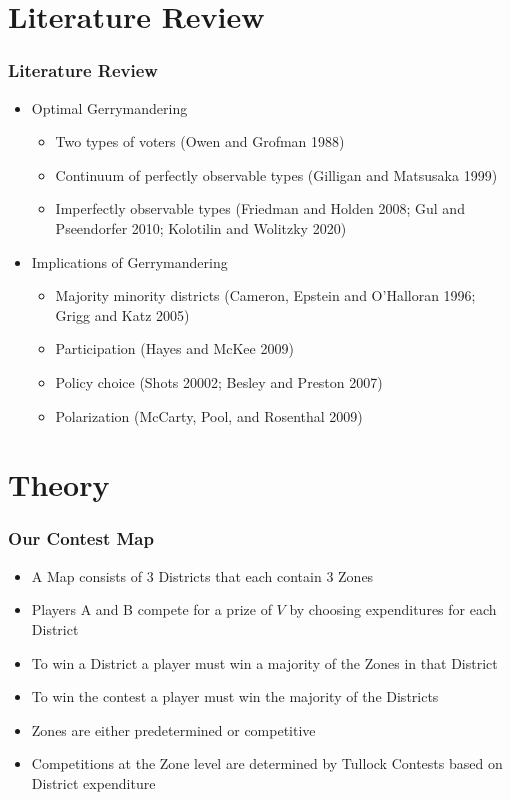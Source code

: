 \documentclass[red]{beamer}
\begin{document}
    \section{Literature Review}
    \begin{frame} [t]
    \frametitle{Literature Review}
    \begin{itemize}
        \item Optimal Gerrymandering
            \begin{itemize}
                \item Two types of voters (Owen and Grofman 1988) 
                \item Continuum of perfectly observable types (Gilligan and Matsusaka 1999)
                \item Imperfectly observable types (Friedman and Holden 2008; Gul and Pseendorfer 2010; Kolotilin and Wolitzky 2020)
            \end{itemize}
        \item Implications of Gerrymandering
            \begin{itemize}
                \item Majority minority districts (Cameron, Epstein and O’Halloran 1996; Grigg and Katz 2005)
                \item Participation (Hayes and McKee 2009)
                \item Policy choice (Shots 20002; Besley and Preston 2007)
                \item Polarization (McCarty, Pool, and Rosenthal 2009)
            \end{itemize}
    \end{itemize}
    \end{frame}

    \section{Theory}
    \begin{frame}[t]
    \frametitle{Our Contest Map}
    \begin{itemize}
        \item A Map consists of 3 Districts that each contain 3 Zones
        \item Players A and B compete for a prize of $V$ by choosing expenditures for each District
        \item To win a District a player must win a majority of the Zones in that District
        \item To win the contest a player must win the majority of the Districts
        \item Zones are either predetermined or competitive
        \item Competitions at the Zone level are determined by Tullock Contests based on District expenditure
    \end{itemize}
    \end{frame}
\end{document}
